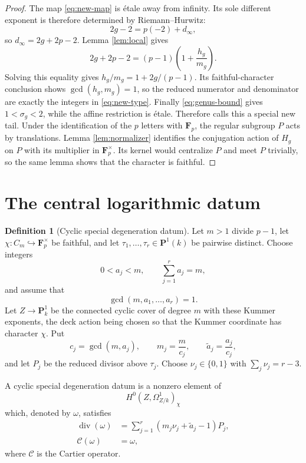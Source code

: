 \documentclass[11pt]{amsart}
\theoremstyle{plain}
\theoremstyle{definition}
\newtheorem{definition}[theorem]{Definition}
\numberwithin{equation}{section}
\begin{document}
\begin{proof}
The map \eqref{eq:new-map} is \'etale away from infinity.  Its sole different
exponent is therefore determined by Riemann--Hurwitz:
\[
 2g-2=p(-2)+d_\infty,
\]
so $d_\infty=2g+2p-2$.  Lemma \ref{lem:local} gives
\[
 2g+2p-2=(p-1)\left(1+\frac{h_g}{m_g}\right).
\]
Solving this equality gives
$h_g/m_g=1+2g/(p-1)$.  Its faithful-character conclusion shows
$\gcd(h_g,m_g)=1$, so the reduced numerator and denominator are exactly the
integers in \eqref{eq:new-type}.  Finally \eqref{eq:genus-bound} gives
$1<\sigma_g<2$, while the
affine restriction is étale.
Therefore \cite[Definition 2.10]{WewersThree} calls this a special new tail.
Under the identification of the $p$ letters with $\mathbf F_p$, the regular
subgroup $P$ acts by translations.  Lemma \ref{lem:normalizer} identifies
the conjugation action of $H_g$ on $P$ with its multiplier in
$\mathbf F_p^\times$.  Its kernel would centralize $P$ and meet $P$
trivially, so the same lemma shows that the character is faithful.
\end{proof}

\section{The central logarithmic datum}

\begin{definition}[Cyclic special degeneration datum]
\label{def:cyclic-degeneration}
Let $m>1$ divide $p-1$, let
$\chi:C_m\hookrightarrow\mathbf F_p^\times$ be faithful, and let
$\tau_1,\ldots,\tau_r\in\mathbf P^1(k)$ be pairwise distinct.  Choose
integers
\[
 0<a_j<m,\qquad \sum_{j=1}^r a_j=m,
\]
and assume that
\[
 \gcd(m,a_1,\ldots,a_r)=1.
\]
Let $Z\to\mathbf P^1_k$ be the connected cyclic cover of degree $m$
with these Kummer exponents, the deck action being chosen so that the
Kummer coordinate has character $\chi$.  Put
\[
 c_j=\gcd(m,a_j),\qquad m_j=\frac{m}{c_j},\qquad
 \widetilde a_j=\frac{a_j}{c_j},
\]
and let $P_j$ be the reduced divisor above $\tau_j$.  Choose
$\nu_j\in\{0,1\}$ with $\sum_j\nu_j=r-3$.

A cyclic special degeneration datum is a nonzero element of
\[
 H^0(Z,\Omega^1_{Z/k})_\chi
\]
which, denoted by $\omega$, satisfies
\begin{align}
 \operatorname{div}(\omega)
 &=\sum_{j=1}^r(m_j\nu_j+\widetilde a_j-1)P_j,
 \label{eq:degeneration-divisor}\\
 \mathcal C(\omega)&=\omega,
 \label{eq:degeneration-cartier}
\end{align}
where $\mathcal C$ is the Cartier operator.
\end{definition}
\end{document}
